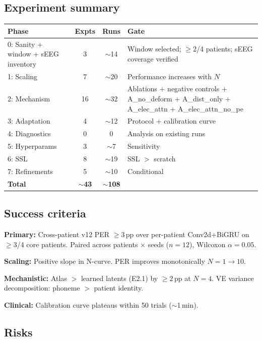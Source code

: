 \documentclass[11pt,letterpaper]{article}
\newcommand{\pp}{\,\text{pp}}
\begin{document}
\subsection{Experiment summary}

\begin{table}[ht!]\centering\small
\begin{tabular}{@{}lccl@{}}
\toprule
\textbf{Phase} & \textbf{Expts} & \textbf{Runs} & \textbf{Gate} \\
\midrule
0: Sanity + window + sEEG inventory & 3 & ${\sim}$14 & Window selected; $\geq$2/4 patients; sEEG coverage verified \\
1: Scaling & 7 & ${\sim}$20 & Performance increases with $N$ \\
2: Mechanism & 16 & ${\sim}$32 & Ablations + negative controls + A\_no\_deform + A\_dist\_only + A\_elec\_attn + A\_elec\_attn\_no\_pe \\
3: Adaptation & 4 & ${\sim}$12 & Protocol + calibration curve \\
4: Diagnostics & 0 & 0 & Analysis on existing runs \\
5: Hyperparams & 3 & ${\sim}$7 & Sensitivity \\
6: SSL & 8 & ${\sim}$19 & SSL $>$ scratch \\
7: Refinements & 5 & ${\sim}$10 & Conditional \\
\midrule
\textbf{Total} & ${\sim}$\textbf{43} & ${\sim}$\textbf{108} & \\
\bottomrule
\end{tabular}
\end{table}

\subsection{Success criteria}\label{sec:success}

\textbf{Primary:} Cross-patient v12 PER $\geq 3\pp$ over per-patient Conv2d+BiGRU on $\geq$3/4 core patients. Paired across patients $\times$ seeds ($n{=}12$), Wilcoxon $\alpha{=}0.05$.

\textbf{Scaling:} Positive slope in N-curve. PER improves monotonically $N{=}1 \to 10$.

\textbf{Mechanistic:} Atlas $>$ learned latents (E2.1) by $\geq 2\pp$ at $N{=}4$. VE variance decomposition: phoneme $>$ patient identity.

\textbf{Clinical:} Calibration curve plateaus within 50 trials (${\sim}$1\,min).

\subsection{Risks}\label{sec:risks}
\end{document}
